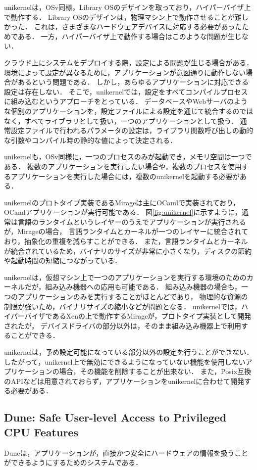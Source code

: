 \documentclass[graduation-thesis]{mlarticle}
\begin{document}
unikernelは，OSv同様，Library OSのデザインを取っており，ハイパーバイザ上で動作する．
Library OSのデザインは，物理マシン上で動作させることが難しかった．
これは，さまざまなハードウェアデバイスに対応する必要があったためである．
一方，ハイパーバイザ上で動作する場合はこのような問題が生じない．

クラウド上にシステムをデプロイする際，設定による問題が生じる場合がある．
環境によって設定が異なるために，アプリケーションが意図通りに動作しない場合があるという問題である．
しかし，あらゆるアプリケーションに対応できる設定は存在しない．
そこで，unikernelでは，設定をすべてコンパイルプロセスに組み込むというアプローチをとっている．
データベースやWebサーバのような個別のアプリケーションを，設定ファイルによる設定を通じて統合するのではなく，すべてライブラリとして扱い，一つのアプリケーションとして扱う．
通常設定ファイルで行われるパラメータの設定は，ライブラリ関数呼び出しの動的な引数やコンパイル時の静的な値によって決定される．

unikernelも，OSv同様に，一つのプロセスのみが起動でき，メモリ空間は一つである．
複数のアプリケーションを実行したい場合や，複数のプロセスを使用するアプリケーションを実行した場合には，複数のunikernelを起動する必要がある．

unikernelのプロトタイプ実装であるMirageは主にOCamlで実装されており，OCamlアプリケーションが実行可能である．
図\ref{fig:unikernel}に示すように，通常は言語のランタイムというレイヤーのうえでアプリケーションが実行されるが，Mirageの場合，
言語ランタイムとカーネルが一つのレイヤーに統合されており，抽象化の重複を減らすことができる．
また，言語ランタイムとカーネルが統合されているため，バイナリのサイズが非常に小さくなり，ディスクの節約や起動時間の短縮につながっている．

unikernelは，仮想マシン上で一つのアプリケーションを実行する環境のためのカーネルだが，組み込み機器への応用も可能である．
組み込み機器の場合も，一つのアプリケーションのみを実行することがほとんどであり，
物理的な資源の制限が強いため，バイナリサイズの縮小などが問題となる．
unikernelでは，ハイパーバイザであるXenの上で動作するMirageが，プロトタイプ実装として開発されたが，
デバイスドライバの部分以外は，そのまま組み込み機器上で利用することができる．

unikernelは，予め設定可能になっている部分以外の設定を行うことができない．
したがって，unikernel上で無効にできるようになっていない機能を使用しないアプリケーションの場合，その機能を削除することが出来ない．
また，Posix互換のAPIなどは用意されておらず，アプリケーションをunikernelに合わせて開発する必要がある．

\subsection{Dune: Safe User-level Access to Privileged CPU Features}
\label{relative:dune}
Duneは，アプリケーションが，直接かつ安全にハードウェアの情報を扱うことができるようにするためのシステムである．
\end{document}
